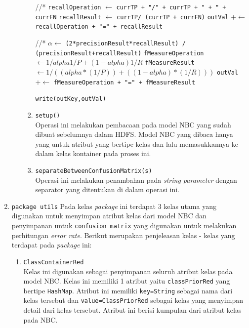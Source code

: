 \begin{enumerate}
\begin{itemize}
\begin{enumerate}
\begin{algorithm}[H]
\begin{algorithmic}[1]
				//*
				\State \texttt{recallOperation} $\gets$ \texttt{currTP + "/" + currTP + " + " + currFN}
				\State \texttt{recallResult} $\gets$ \texttt{currTP/ (currTP + currFN)}
				\State \texttt{outVal} $+\gets$ \texttt{recallOperation + "=" + recallResult}
				
				//*
				\State $\alpha \gets$ \texttt{(2*precisionResult*recallResult) / (precisionResult+recallResult)}
				\State \texttt{fMeasureOperation} $\gets 1 / {alpha{1 / P}+(1-alpha) 1/R}$
				\State \texttt{fMeasureResult} $\gets 1/((alpha * (1/P)) + ((1 - alpha) * (1/R)))$
				\State \texttt{outVal} $+\gets$ \texttt{fMeasureOperation + "=" + fMeasureResult}
				
				
			\EndFor
			
			\State \texttt{write(outKey,outVal)}
				
			\EndProcedure
			\end{algorithmic}
			\end{algorithm}
			
			\item{\texttt{setup()}}\\
			Operasi ini melakukan pembacaan pada model NBC yang sudah dibuat sebelumnya dalam HDFS. Model NBC yang dibaca hanya yang untuk atribut yang bertipe kelas dan lalu memasukkannya ke dalam kelas kontainer pada proses ini.
			
			
			\item{\texttt{separateBetweenConfusionMatrix(s)}}\\
			Operasi ini melakukan penambahan pada \textit{string parameter} dengan separator yang ditentukan di dalam operasi ini.
			
		\end{enumerate}
	
		
		
		
	\end{itemize}
	
	\item \texttt{package utils}
	Pada kelas \textit{package} ini	terdapat 3 kelas utama yang digunakan untuk menyimpan atribut kelas dari model NBC dan penyimpanan untuk \texttt{confusion matrix} yang digunakan untuk melakukan perhitungan \textit{error rate}. Berikut merupakan penjeleasan kelas - kelas yang terdapat pada \textit{package} ini:
	\begin{enumerate}
		\item \texttt{ClassContainerRed}\\
		Kelas ini digunakan sebagai penyimpanan seluruh atribut kelas pada model NBC. Kelas ini memiliki 1 atribut yaitu \texttt{classPriorRed} yang bertipe \texttt{HashMap}. Atribut ini memiliki \texttt{key=String} sebagai nama dari kelas tersebut dan \texttt{value=ClassPriorRed} sebagai kelas yang menyimpan detail dari kelas tersebut. Atribut ini berisi kumpulan dari atribut kelas pada NBC.
		

\end{enumerate}
\end{enumerate}
